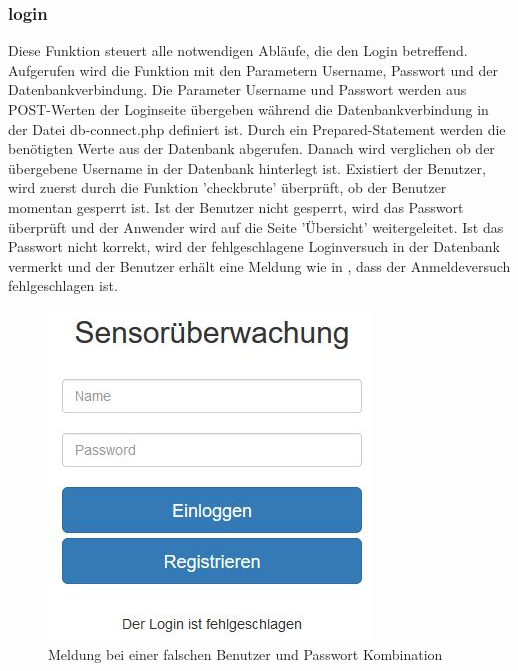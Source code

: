 \subsubsection{login}
Diese Funktion steuert alle notwendigen Abläufe, die den Login betreffend.\\
Aufgerufen wird die Funktion mit den Parametern Username, Passwort und der Datenbankverbindung. Die Parameter Username und Passwort werden aus POST-Werten der Loginseite übergeben während die Datenbankverbindung in der Datei db-connect.php definiert ist. Durch ein Prepared-Statement werden die benötigten Werte aus der Datenbank abgerufen. Danach wird verglichen ob der übergebene Username in der Datenbank hinterlegt ist. Existiert der Benutzer, wird zuerst durch die Funktion 'checkbrute' überprüft, ob der Benutzer momentan gesperrt ist. Ist der Benutzer nicht gesperrt, wird das Passwort überprüft und der Anwender wird auf die Seite 'Übersicht' weitergeleitet. Ist das Passwort nicht korrekt, wird der fehlgeschlagene Loginversuch in der Datenbank vermerkt und der Benutzer erhält eine Meldung wie in , dass der Anmeldeversuch fehlgeschlagen ist.

\begin{figure} [htb]
\begin{centering}
\includegraphics{Bilder/Kapitel4/login_fehlgeschlagen.jpg}
\caption[Meldung bei einer falschen Benutzer/Passwort Kombination]{Meldung bei einer falschen Benutzer und Passwort Kombination}
\label{computersaysno}
\end{centering}
\end{figure}


